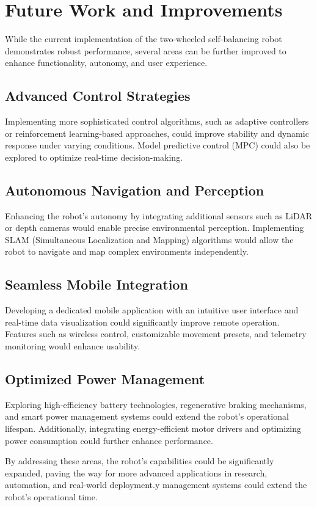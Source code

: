 \section{Future Work and Improvements}
While the current implementation of the two-wheeled self-balancing robot demonstrates robust performance, several areas can be further improved to enhance functionality, autonomy, and user experience.


\subsection{Advanced Control Strategies}
Implementing more sophisticated control algorithms, such as adaptive controllers or reinforcement learning-based approaches, could improve stability and dynamic response under varying conditions. Model predictive control (MPC) could also be explored to optimize real-time decision-making.


\subsection{Autonomous Navigation and Perception}
Enhancing the robot’s autonomy by integrating additional sensors such as LiDAR or depth cameras would enable precise environmental perception. Implementing SLAM (Simultaneous Localization and Mapping) algorithms would allow the robot to navigate and map complex environments independently.


\subsection{Seamless Mobile Integration}
Developing a dedicated mobile application with an intuitive user interface and real-time data visualization could significantly improve remote operation. Features such as wireless control, customizable movement presets, and telemetry monitoring would enhance usability.

\subsection{Optimized Power Management}
Exploring high-efficiency battery technologies, regenerative braking mechanisms, and smart power management systems could extend the robot’s operational lifespan. Additionally, integrating energy-efficient motor drivers and optimizing power consumption could further enhance performance.

By addressing these areas, the robot’s capabilities could be significantly expanded, paving the way for more advanced applications in research, automation, and real-world deployment.y management systems could extend the robot's operational time.